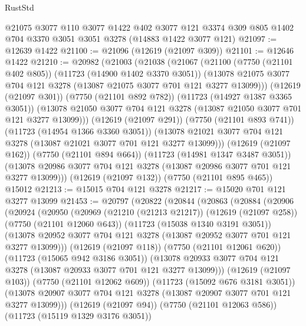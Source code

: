 \begin{lexlean}{RustStd}
\begin{coremodule}
    @21075
    @3077
    @110
    @3077
    @1422
    @402
    @3077
    @121
    @3374
    @309
    @805
    @1402
    @704
    @3370
    @3051
    @3051
    @3278
    (@14883 @1422 @3077 @121)
@21097 := @12639 @1422
@21100 := @21096 (@12619 (@21097 @309))
@21101 := @12646 @1422
@21210 := @20982
    (@21003
      (@21038
        (@21067
          (@21100
            (@7750 (@21101 @402 @805))
            (@11723 (@14900 @1402 @3370 @3051))
            (@13078 @21075 @3077 @704 @121 @3278 (@13087 @21075 @3077 @701 @121 @3277 @13099)))
          (@12619 (@21097 @301))
          (@7750 (@21101 @892 @782))
          (@11723 (@14927 @1387 @3365 @3051))
          (@13078 @21050 @3077 @704 @121 @3278 (@13087 @21050 @3077 @701 @121 @3277 @13099)))
        (@12619 (@21097 @291))
        (@7750 (@21101 @893 @741))
        (@11723 (@14954 @1366 @3360 @3051))
        (@13078 @21021 @3077 @704 @121 @3278 (@13087 @21021 @3077 @701 @121 @3277 @13099)))
      (@12619 (@21097 @162))
      (@7750 (@21101 @894 @664))
      (@11723 (@14981 @1347 @3487 @3051))
      (@13078 @20986 @3077 @704 @121 @3278 (@13087 @20986 @3077 @701 @121 @3277 @13099)))
    (@12619 (@21097 @132))
    (@7750 (@21101 @895 @465))
    @15012
@21213 := @15015 @704 @121 @3278
@21217 := @15020 @701 @121 @3277 @13099
@21453 := @20797
    (@20822
      (@20844
        (@20863
          (@20884
            (@20906
              (@20924
                (@20950
                  (@20969
                    (@21210 (@21213 @21217))
                    (@12619 (@21097 @258))
                    (@7750 (@21101 @12060 @643))
                    (@11723 (@15038 @1340 @3191 @3051))
                    (@13078
                      @20952
                      @3077
                      @704
                      @121
                      @3278
                      (@13087 @20952 @3077 @701 @121 @3277 @13099)))
                  (@12619 (@21097 @118))
                  (@7750 (@21101 @12061 @620))
                  (@11723 (@15065 @942 @3186 @3051))
                  (@13078
                    @20933
                    @3077
                    @704
                    @121
                    @3278
                    (@13087 @20933 @3077 @701 @121 @3277 @13099)))
                (@12619 (@21097 @103))
                (@7750 (@21101 @12062 @609))
                (@11723 (@15092 @676 @3181 @3051))
                (@13078 @20907 @3077 @704 @121 @3278 (@13087 @20907 @3077 @701 @121 @3277 @13099)))
              (@12619 (@21097 @94))
              (@7750 (@21101 @12063 @586))
              (@11723 (@15119 @1329 @3176 @3051))

\end{coremodule}
\end{lexlean}
